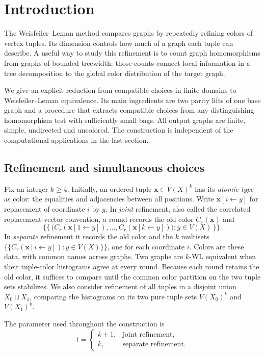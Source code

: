 \section{Introduction}\label{sec:introduction}

The Weisfeiler--Leman method compares graphs by repeatedly refining
colors of vertex tuples. Its dimension controls how much of a graph
each tuple can describe. A useful way to study this refinement is to
count graph homomorphisms from graphs of bounded treewidth: those
counts connect local information in a tree decomposition to the global
color distribution of the target graph.

We give an explicit reduction from compatible choices in finite domains
to Weisfeiler--Leman equivalence. Its main ingredients are two parity
lifts of one base graph and a procedure that extracts compatible choices
from any distinguishing homomorphism test with sufficiently small bags.
All output graphs are finite, simple, undirected and uncolored.
The construction is independent of the computational applications in
the last section.

\subsection{Refinement and simultaneous choices}

Fix an integer \(k\ge4\). Initially, an ordered tuple
\(\mathbf x\in V(X)^k\) has its \emph{atomic type} as color: the
equalities and adjacencies between all positions. Write
\(\mathbf x[i\leftarrow y]\) for replacement of coordinate \(i\) by \(y\).
In \emph{joint} refinement, also called the correlated replacement-vector
convention, a round records the old color \(C_r(\mathbf x)\) and
\[
 \{\!\{\,\bigl(C_r(\mathbf x[1\leftarrow y]),\ldots,
                  C_r(\mathbf x[k\leftarrow y])\bigr):
                       y\in V(X)\,\}\!\}.
\]
In \emph{separate} refinement it records the old color and the \(k\)
multisets
\(\{\!\{C_r(\mathbf x[i\leftarrow y]):y\in V(X)\}\!\}\), one for
each coordinate \(i\). Colors are these data, with common names across
graphs. Two graphs are \(k\)-WL equivalent when their tuple-color
histograms agree at every round. Because each round retains the old
color, it suffices to compare until the common color partition on the
two tuple sets stabilizes.
We also consider refinement of all tuples in a disjoint union
\(X_0\sqcup X_1\), comparing the histograms on its two pure tuple sets
\(V(X_0)^k\) and \(V(X_1)^k\).

The parameter used throughout the construction is
\begin{equation}\label{eq:bag-parameter}
 t=\begin{cases}
      k+1,&\text{joint refinement},\\
      k,&\text{separate refinement}.
    \end{cases}
\end{equation}

